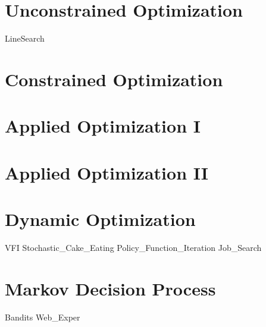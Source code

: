 \documentclass[nociteref]{newsiambook}
\begin{document}
\part{Unconstrained Optimization}
{LineSearch}

\part{Constrained Optimization}

\part{Applied Optimization I}

\part{Applied Optimization II}

\part{Dynamic Optimization}
{VFI}
{Stochastic_Cake_Eating}
{Policy_Function_Iteration}
{Job_Search}

\part{Markov Decision Process}
{Bandits}
{Web_Exper}
\end{document}
